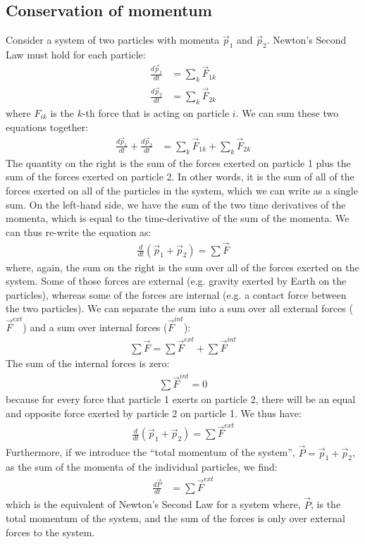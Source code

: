 \subsection{Conservation of momentum}
Consider a system of two particles with momenta $\vec p_1$ and $\vec p_2$.  Newton's Second Law must hold for each particle:
\begin{align*}
\frac{d\vec p_1}{dt}&=\sum_k \vec F_{1k}\\
\frac{d\vec p_2}{dt}&=\sum_k \vec F_{2k}
\end{align*}
where $F_{ik}$ is the $k$-th force that is acting on particle $i$.  We can sum these two equations together:
\begin{align*}
\frac{d\vec p_1}{dt}+\frac{d\vec p_2}{dt} &= \sum_k \vec F_{1k} + \sum_k \vec F_{2k}
\end{align*}
The quantity on the right is the sum of the forces exerted on particle 1 plus the sum of the forces exerted on particle 2. In other words, it is the sum of all of the forces exerted on all of the particles in the system, which we can write as a single sum. On the left-hand side, we have the sum of the two time derivatives of the momenta, which is equal to the time-derivative of the sum of the momenta. We can thus re-write the equation as:
\begin{align*}
\frac{d}{dt}(\vec p_1 + \vec p_2) = \sum \vec F
\end{align*}
where, again, the sum on the right is the sum over all of the forces exerted on the system. Some of those forces are external (e.g. gravity exerted by Earth on the particles), whereas some of the forces are internal (e.g. a contact force between the two particles). We can separate the sum into a sum over all external forces ($\vec F^{ext}$) and a sum over internal forces ($\vec F^{int}$):
\begin{align*}
\sum \vec F = \sum \vec F^{ext} + \sum \vec F^{int} 
\end{align*}
The sum of the internal forces is zero:
\begin{align*}
\sum \vec F^{int} = 0
\end{align*}
because for every force that particle 1 exerts on particle 2, there will be an equal and opposite force exerted by particle 2 on particle 1. We thus have:
\begin{align*}
\frac{d}{dt}(\vec p_1 + \vec p_2) = \sum \vec F^{ext}
\end{align*}
Furthermore, if we introduce the ``total momentum of the system'', $\vec P=\vec p_1 + \vec p_2$, as the sum of the momenta of the individual particles, we find:
\begin{align*}
\frac{d\vec P}{dt} &= \sum \vec F^{ext}
\end{align*}
which is the equivalent of Newton's Second Law for a system where, $\vec P$, is the total momentum of the system, and the sum of the forces is only over external forces to the system.

